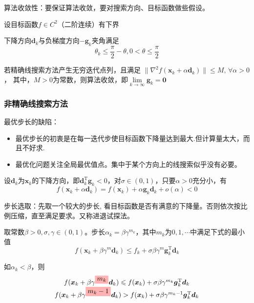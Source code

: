 \begin{note}
    算法收敛性：要保证算法收敛，要对搜索方向、目标函数做些假设。
    \begin{theorem}
        设目标函数$f\in C^2\text{（二阶连续）}$有下界
        
        下降方向$\boldsymbol{d}_k$与负梯度方向$-\boldsymbol{g}_k$夹角满足
        \[
            \theta_k\leqslant\dfrac{\pi}{2}-\theta,0<\theta\leqslant\dfrac{\pi}{2}   
        \]

        若精确线搜索方法产生无穷迭代点列，且满足
        $\| \nabla^2 f(\boldsymbol{x}_k+\alpha\boldsymbol{d}_k) \|\leqslant M,\,\forall \alpha>0$，\newline
        其中，$M>0$为常数，则算法收敛，即$\lim\limits_{k\to \infty}\boldsymbol{g}_k = \boldsymbol{0}$
    \end{theorem}
\end{note}

\subsubsection{非精确线搜索方法}
\begin{note}
    最优步长的缺陷：
    \begin{itemize}
        \item 最优步长的初衷是在每一迭代步使目标函数下降量达到最大.但计算量太大，而且不好求. 
        \item 最优化问题关注全局最优值点。集中于某个方向上的线搜索似乎没有必要。
    \end{itemize}
\end{note}

设$\boldsymbol{d}_k$为$\boldsymbol{x}_k$的下降方向，即$\boldsymbol{d}_{k}^{\mathrm{T}}\boldsymbol{g}_k<0$，对$\sigma\in\left( 0,1 \right)$，只要$\alpha>0$充分小，有
\[
    f(\boldsymbol{x}_k+\alpha\boldsymbol{d}_k) = f(\boldsymbol{x}_k)+\alpha \boldsymbol{g}_{k}\boldsymbol{d}_k+o(\alpha)<0
\]

步长选取：先取一个较大的步长, 看目标函数是否有满意的下降量。否则依次按比例压缩，直至满足要求。又称进退试探法。
\begin{definition}[Armijo步长规则]
    取常数$\beta>0,\sigma,\gamma\in(0,1)$。步长$\alpha_k = \beta \gamma^{m_k}$，其中$m_k$为$0,1,\cdots$中满足下式的最小值
    \[
        f(\boldsymbol{x}_k+\beta\gamma^m\boldsymbol{d}_k) \leqslant f_k+\sigma\beta\gamma^m\boldsymbol{g}_k^{\mathrm{T}}\boldsymbol{d}_k
    \]

    如$\alpha_k<\beta$，则
    \[
        \begin{array}{c}
            f(\boldsymbol{x}_k+\beta\gamma^{\colorbox{red!30}{$m_k$}}\boldsymbol{d}_k)\leqslant f(\boldsymbol{x}_k)+\sigma\beta\gamma^{m_k}\boldsymbol{g}_k^{\mathrm{T}}\boldsymbol{d}_k\\
            f(\boldsymbol{x}_k+\beta\gamma^{\colorbox{red!30}{$m_k-1$}}\boldsymbol{d}_k)> f(\boldsymbol{x}_k)+\sigma\beta\gamma^{m_k-1}\boldsymbol{g}_k^{\mathrm{T}}\boldsymbol{d}_k
        \end{array}
    \]
\end{definition}

